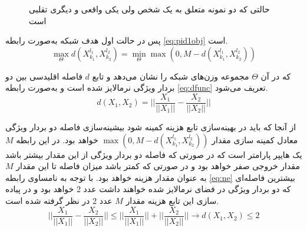 \begin{figure}[ht]
 
 	\caption{حالتی که دو نمونه متعلق به یک شخص ولی یکی واقعی و دیگری تقلبی است}
 	\label{fig:pid1}
 \end{figure}

پس در حالت اول هدف شبکه به‌صورت رابطه
\ref{eq:pid1obj}
است.
\begin{equation}\label{eq:pid1obj}
	\max_{\Theta} {d( X_{k_1}^{l_1},X_{k_2}^{l_2} )} = \min_{\Theta}{\max(0,M-d( X_{k_1}^{l_1},X_{k_2}^{l_2} ))}
\end{equation}

که در آن 
$\Theta$
 مجموعه وزن‌های شبکه را نشان می‌دهد و تابع $d$ فاصله اقلیدسی بین دو بردار ویژگی نرمالایز شده است و به‌صورت رابطه 
\ref{eq:dfunc}
  تعریف می‌شود.
  \begin{equation}\label{eq:dfunc}
  	d(X_1,X_2) = ||\frac{X_1}{||X_1||}-\frac{X_2}{||X_2||}||
  \end{equation}

از آنجا که باید در بهینه‌سازی تابع هزینه کمینه شود بیشینه‌سازی فاصله دو بردار ویژگی معادل کمینه سازی مقدار 
$\max(0,M-d( X_{k_1}^{l_1},X_{k_2}^{l_2} ))$
 خواهد بود. در این رابطه $M$ یک هایپر پارامتر است که در صورتی که فاصله دو بردار ویژگی از این مقدار بیشتر باشد مقدار خروجی صفر خواهد بود و در صورتی که کمتر باشد میزان فاصله تا این مقدار $M$ به عنوان مقدار هزینه خواهد بود.
با توجه به نامساوی رابطه
\ref{eq:ne}
بیشترین فاصله‌ای که دو بردار ویژگی در فضای نرمالایز شده خواهند داشت عدد 2 خواهد بود و در پیاده سازی این تابع هزینه مقدار $M$ عدد 2 در نظر گرفته شده است.
  \begin{equation}\label{eq:ne}
	||\frac{X_1}{||X_1||}-\frac{X_2}{||X_2||}|| \le ||\frac{X_1}{||X_1||}||+||\frac{X_2}{||X_2||}||   \to d(X_1,X_2) \le 2
\end{equation}

